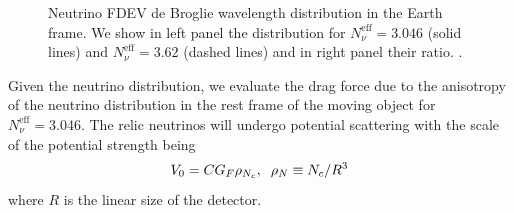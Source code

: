 \begin{figure} 
\begin{minipage}{\textwidth}
\end{minipage}
\caption{Neutrino  FDEV de Broglie wavelength  distribution in the Earth frame. We show in left panel the distribution for $N_\nu^{\mathrm{eff}}=3.046$ (solid lines) and $N_\nu^{\mathrm{eff}}=3.62$ (dashed lines) and in right panel their ratio. .  }\label{fig:deBrogle_300}
 \end{figure}

Given the neutrino distribution, we evaluate the drag force due to the anisotropy of the neutrino distribution in the rest frame of the moving object for $N_\nu^{\mathrm{eff}}=3.046$. The relic neutrinos will undergo potential scattering with the scale of the potential strength being
\begin{equation}\label{V0}
V_0=CG_F\rho_{N_c},\hspace{2mm} \rho_N\equiv N_c/R^3
\end{equation}
where $R$ is the linear size of the detector.  

